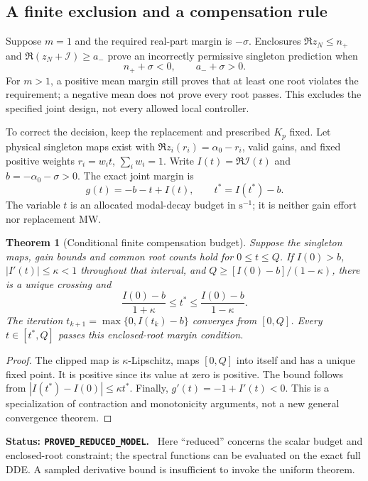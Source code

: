 \documentclass[11pt]{article}
\newtheorem{theorem}{Theorem}
\newcommand{\status}[1]{\par\smallskip\noindent\textbf{Status: \texttt{#1}.}\ }
\begin{document}
\subsection{A finite exclusion and a compensation rule}
Suppose $m=1$ and the required real-part margin is $-\sigma$.
Enclosures $\Re z_N\le n_+$ and $\Re(z_N+\mathcal I)\ge a_-$ prove an
incorrectly permissive singleton prediction when
\begin{equation}
 n_++\sigma<0,\qquad a_-+\sigma>0.\label{eq:finite-decision}
\end{equation}
For $m>1$, a positive mean margin still proves that at least one root violates
the requirement; a negative mean does not prove every root passes.
This excludes the specified joint design, not every allowed local controller.

To correct the decision, keep the replacement and prescribed $K_p$ fixed.
Let physical singleton maps exist with
$\Re z_i(r_i)=\alpha_0-r_i$, valid gains, and fixed positive weights
$r_i=w_i t$, $\sum_iw_i=1$. Write $I(t)=\Re\mathcal I(t)$ and
$b=-\alpha_0-\sigma>0$. The exact joint margin is
\begin{equation}
 \boxed{g(t)=-b-t+I(t),\qquad t^*=I(t^*)-b.}\label{eq:budget-fixedpoint}
\end{equation}
The variable $t$ is an allocated modal-decay budget in $\mathrm{s}^{-1}$;
it is neither gain effort nor replacement MW.

\begin{theorem}[Conditional finite compensation budget]
Suppose the singleton maps, gain bounds and common root counts hold for
$0\le t\le Q$. If $I(0)>b$, $|I'(t)|\le\kappa<1$ throughout that interval,
and $Q\ge[I(0)-b]/(1-\kappa)$, there is a unique crossing and
\begin{equation}
 \frac{I(0)-b}{1+\kappa}\le t^*\le
 \frac{I(0)-b}{1-\kappa}.
\end{equation}
The iteration $t_{k+1}=\max\{0,I(t_k)-b\}$ converges from $[0,Q]$.
Every $t\in[t^*,Q]$ passes this enclosed-root margin condition.
\end{theorem}
\begin{proof}
The clipped map is $\kappa$-Lipschitz, maps $[0,Q]$ into itself and has
a unique fixed point. It is positive since its value at zero is positive.
The bound follows from $|I(t^*)-I(0)|\le\kappa t^*$.
Finally, $g'(t)=-1+I'(t)<0$. This is a specialization of contraction and
monotonicity arguments, not a new general convergence theorem.
\end{proof}
\status{PROVED\_REDUCED\_MODEL}
Here ``reduced'' concerns the scalar budget and enclosed-root constraint;
the spectral functions can be evaluated on the exact full DDE. A sampled
derivative bound is insufficient to invoke the uniform theorem.
\end{document}
